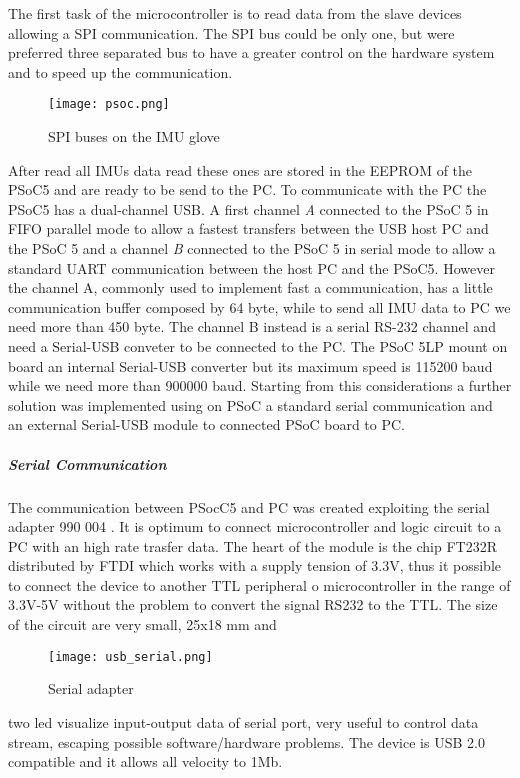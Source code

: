 The first task of the microcontroller is to read data from the slave devices allowing a SPI communication. The SPI bus could be only one, but were preferred three separated bus to have a greater control on the hardware system and to speed up the communication. 
\begin{figure}[h]
\centering
\texttt{[image: psoc.png]}
\caption{SPI buses on the IMU glove}
\label{fig:spibuses}
\end{figure}

After read all IMUs data read these ones are stored in the EEPROM of the PSoC5 and are ready to be send to the PC. To communicate with the PC the PSoC5 has a dual-channel USB. A first channel \textit{A} %
connected to the PSoC 5 in FIFO parallel mode to allow a fastest transfers between the USB host PC and the PSoC 5 and a channel \textit{B} connected to the PSoC 5 in serial mode to allow a standard UART communication between the host PC and the PSoC5. However the channel A, commonly used to implement fast a communication, has a little communication buffer composed by 64 byte, while to send all IMU data to PC we need more than 450 byte. The channel B instead is a serial RS-232 channel and need a Serial-USB conveter to be connected to the PC. The PSoC 5LP mount on board an internal Serial-USB converter but its maximum speed is 115200 baud while we need more than 900000 baud.
Starting from this considerations a further solution was implemented using on PSoC a standard serial communication and an external Serial-USB module to connected PSoC board to PC.     

\subparagraph{Serial Communication}

The communication between PSocC5 and PC was created exploiting the serial adapter 990 004 \cite{Serial_USB}. It is optimum to connect microcontroller and logic circuit to a PC with an high rate trasfer data. The heart of the module is the chip FT232R distributed by FTDI \cite{FDTI_homepage} which works with a supply tension of 3.3V, thus it possible to connect the device to another TTL peripheral o microcontroller in the range of 3.3V-5V without the problem to convert the signal RS232 to  the TTL. The size of the circuit are very small, 25x18 mm and
\begin{figure}[h]
\centering
\texttt{[image: usb\_serial.png]}
\caption{Serial adapter}
\label{fig:serial_adapter}
\end{figure}
two led visualize input-output data of serial port, very useful to control data stream, escaping possible software/hardware problems. The device is USB 2.0 compatible and it allows all velocity to 1Mb. 

